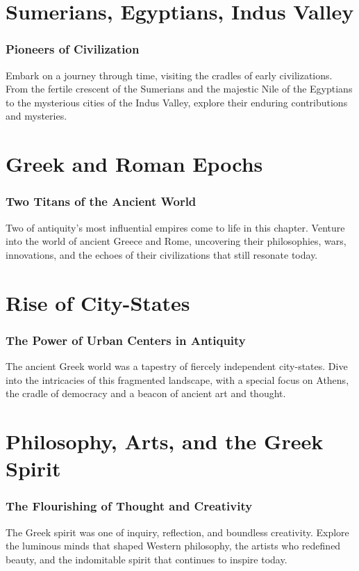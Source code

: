 \documentclass[a4paper,12pt]{book}
\begin{document}
\chapter{Sumerians, Egyptians, Indus Valley}
\subsection*{Pioneers of Civilization}
Embark on a journey through time, visiting the cradles of early civilizations. From the fertile crescent of the Sumerians and the majestic Nile of the Egyptians to the mysterious cities of the Indus Valley, explore their enduring contributions and mysteries.

\chapter{Greek and Roman Epochs}
\subsection*{Two Titans of the Ancient World}
Two of antiquity's most influential empires come to life in this chapter. Venture into the world of ancient Greece and Rome, uncovering their philosophies, wars, innovations, and the echoes of their civilizations that still resonate today.

\chapter{Rise of City-States}
\subsection*{The Power of Urban Centers in Antiquity}
The ancient Greek world was a tapestry of fiercely independent city-states. Dive into the intricacies of this fragmented landscape, with a special focus on Athens, the cradle of democracy and a beacon of ancient art and thought.

\chapter{Philosophy, Arts, and the Greek Spirit}
\subsection*{The Flourishing of Thought and Creativity}
The Greek spirit was one of inquiry, reflection, and boundless creativity. Explore the luminous minds that shaped Western philosophy, the artists who redefined beauty, and the indomitable spirit that continues to inspire today.
\end{document}
